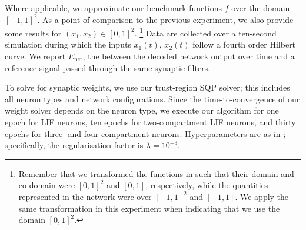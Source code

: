 Where applicable, we approximate our benchmark functions $f$ over the domain $[-1, 1]^2$.
As a point of comparison to the previous experiment, we also provide some results for $(x_1, x_2) \in [0, 1]^2$.%
\footnote{
Remember that we transformed the functions in  such that their domain and co-domain were $[0, 1]^2$ and $[0, 1]$, respectively, while the quantities represented in the network were over $[-1, 1]^2$ and $[-1, 1]$.
We apply the same transformation in this experiment when indicating that we use the domain $[0, 1]^2$.
}
Data are collected over a ten-second simulation during which the inputs $x_1(t)$, $x_2(t)$ follow a fourth order Hilbert curve.
We report $E_\mathrm{net}$, the \NRMSE between the decoded network output over time and a reference signal passed through the same synaptic filters.

To solve for synaptic weights, we use our trust-region SQP solver; this includes all neuron types and network configurations.
Since the time-to-convergence of our weight solver depends on the neuron type, we execute our algorithm for one epoch for LIF neurons, ten epochs for two-compartment LIF neurons, and thirty epochs for three- and four-compartment neurons.
Hyperparameters are as in ; specifically, the regularisation factor is $\lambda = 10^{-3}$.

